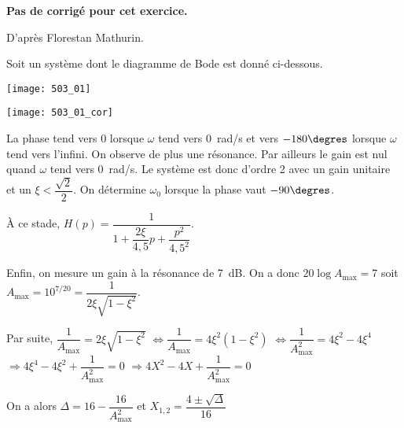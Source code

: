 \normaltrue \difficilefalse \tdifficilefalse
\correctiontrue


\setcounter{question}{0}

\ifcorrection
\else
\textbf{Pas de corrigé pour cet exercice.}
\fi


\ifprof 
\else
\begin{flushright}
D'après Florestan Mathurin.
\end{flushright}

Soit un système dont le diagramme de Bode est donné ci-dessous.
\begin{center}
\texttt{[image: 503\_01]}
\end{center}
\fi

\ifprof
\begin{center}
\texttt{[image: 503\_01\_cor]}
\end{center}
\else
\fi


\ifprof
La phase tend vers 0 lorsque $\omega$ tend vers \SI{0}{rad/s} et vers $-180\degres$ lorsque $\omega$ tend vers l'infini. 
On observe de plus une résonance. Par ailleurs le gain est nul quand $\omega$ tend vers \SI{0}{rad/s}. 
Le système est donc d'ordre 2 avec un gain unitaire et un $\xi<\dfrac{\sqrt{2}}{2}$. 
On détermine $\omega_0$ lorsque la phase vaut $-90\degres$.

À ce stade, $H(p)=\dfrac{1}{1+\dfrac{2\xi}{4,5}p+\dfrac{p^2}{4,5^2}}$.

Enfin, on mesure un gain à la résonance de \SI{7}{dB}. 
On a donc $20\log A_{\text{max}}=7$ soit $A_{\text{max}}=10^{7/20}= \dfrac{1}{2\xi\sqrt{1-\xi^2}}$.

Par suite, 
 $\dfrac{1}{A_{\text{max}}}=2\xi\sqrt{1-\xi^2}$
 $\Leftrightarrow \dfrac{1}{A_{\text{max}}}=4\xi^2\left(1-\xi^2\right)$
 $\Leftrightarrow \dfrac{1}{A^2_{\text{max}}}=4\xi^2-4\xi^4$
  $\Rightarrow 4\xi^4 -4\xi^2+ \dfrac{1}{A^2_{\text{max}}}=0$ 
  $\Rightarrow 4X^2 -4X+ \dfrac{1}{A^2_{\text{max}}}=0$
  
 On a alors $\Delta = 16 -  \dfrac{16}{A^2_{\text{max}}}$ et $X_{1,2} = \dfrac{4\pm\sqrt{\Delta}}{16}$
 
